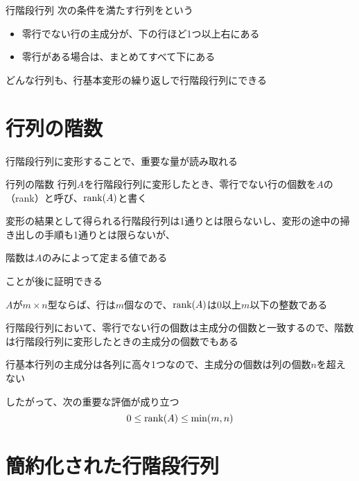 \documentclass[../../../topic_linear-algebra]{subfiles}
\begin{document}
\begin{definition}{行階段行列}
  次の条件を満たす行列をという
  \begin{itemize}
    \item 零行でない行の主成分が、下の行ほど1つ以上右にある
    \item 零行がある場合は、まとめてすべて下にある
  \end{itemize}
\end{definition}

どんな行列も、行基本変形の繰り返しで行階段行列にできる

\sectionline
\section{行列の階数}

行階段行列に変形することで、重要な量が読み取れる

\begin{definition}{行列の階数}
  行列$A$を行階段行列に変形したとき、零行でない行の個数を$A$の（rank）と呼び、$\rank(A)$と書く
\end{definition}

変形の結果として得られる行階段行列は1通りとは限らないし、変形の途中の掃き出しの手順も1通りとは限らないが、
\begin{shaded}
  階数は$A$のみによって定まる値である
\end{shaded}
ことが後に証明できる

\sectionline

$A$が$m \times n$型ならば、行は$m$個なので、$\rank(A)$は0以上$m$以下の整数である

\br

行階段行列において、零行でない行の個数は主成分の個数と一致するので、階数は行階段行列に変形したときの主成分の個数でもある

\br

行基本行列の主成分は各列に高々1つなので、主成分の個数は列の個数$n$を超えない

\br

したがって、次の重要な評価が成り立つ
\begin{equation*}
  0 \leq \rank(A) \leq \min(m,n)
\end{equation*}

\sectionline
\section{簡約化された行階段行列}
\end{document}
